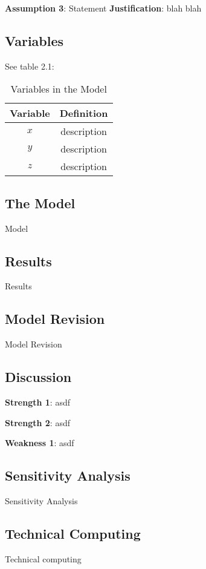 \documentclass{mcm}
\numberwithin{figure}{section}
\numberwithin{table}{section}
\numberwithin{equation}{section}
\begin{document}
    \noindent\textbf{Assumption 3}: Statement
    \textbf{Justification}: blah blah

    \subsection{Variables}
    See table 2.1:
    \begin{table}[h!]
        \centering
        \begin{tabular}{cc}
            \toprule
            Variable & Definition      \\
            \midrule
            $x$      & description     \\
            $y$      & description     \\
            $z$      & description     \\
            \bottomrule
        \end{tabular}
        \caption{Variables in the Model}
        \label{tab:my_label}
    \end{table}

    \subsection{The Model}
    Model

    \subsection{Results}
    Results

    \subsection{Model Revision}
    Model Revision

    \subsection{Discussion}

    \noindent\textbf{Strength 1}: asdf

    \noindent\textbf{Strength 2}: asdf

    \noindent\textbf{Weakness 1}: asdf

    \subsection{Sensitivity Analysis}
    Sensitivity Analysis

    \subsection{Technical Computing}
    Technical computing
\end{document}
